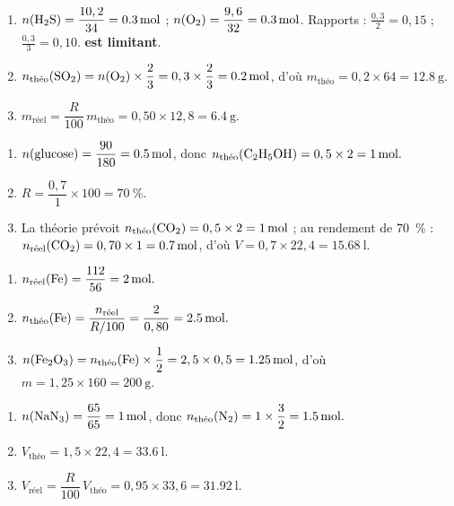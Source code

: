\documentclass[11pt,a4paper]{article}
\begin{document}
\begin{corrige}
\begin{enumerate}[label=\alph*)]
  \item $n(\ce{H2S})=\dfrac{10,2}{34}=\qty{0.3}{\mole}$ ; $n(\ce{O2})=\dfrac{9,6}{32}=\qty{0.3}{\mole}$.
        Rapports :  $\frac{0,3}{2}=0,15$ ;  $\frac{0,3}{3}=0,10$.
        \textbf{ est limitant}.
  \item $n_{\text{théo}}(\ce{SO2})=n(\ce{O2})\times\dfrac{2}{3}=0,3\times\dfrac{2}{3}=\qty{0.2}{\mole}$,
        d'où $m_{\text{théo}}=0,2\times64=\qty{12.8}{\gram}.$
  \item $m_{\text{réel}}=\dfrac{R}{100}\,m_{\text{théo}}=0,50\times12,8=\qty{6.4}{\gram}.$
\end{enumerate}
\end{corrige}

\begin{corrige}
\begin{enumerate}[label=\alph*)]
  \item $n(\ce{glucose})=\dfrac{90}{180}=\qty{0.5}{\mole}$, donc
        $n_{\text{théo}}(\ce{C2H5OH})=0,5\times2=\qty{1}{\mole}.$
  \item $R=\dfrac{0,7}{1}\times100=\qty{70}{\percent}.$
  \item La théorie prévoit $n_{\text{théo}}(\ce{CO2})=0,5\times2=\qty{1}{\mole}$ ; au rendement de
        \qty{70}{\percent} : $n_{\text{réel}}(\ce{CO2})=0,70\times1=\qty{0.7}{\mole}$, d'où
        $V=0,7\times22,4=\qty{15.68}{\litre}.$
\end{enumerate}
\end{corrige}

\begin{corrige}
\begin{enumerate}[label=\alph*)]
  \item $n_{\text{réel}}(\ce{Fe})=\dfrac{112}{56}=\qty{2}{\mole}.$
  \item $n_{\text{théo}}(\ce{Fe})=\dfrac{n_{\text{réel}}}{R/100}=\dfrac{2}{0,80}=\qty{2.5}{\mole}.$
  \item $n(\ce{Fe2O3})=n_{\text{théo}}(\ce{Fe})\times\dfrac{1}{2}=2,5\times0,5=\qty{1.25}{\mole}$,
        d'où $m=1,25\times160=\qty{200}{\gram}.$
\end{enumerate}
\end{corrige}

\begin{corrige}
\begin{enumerate}[label=\alph*)]
  \item $n(\ce{NaN3})=\dfrac{65}{65}=\qty{1}{\mole}$, donc
        $n_{\text{théo}}(\ce{N2})=1\times\dfrac{3}{2}=\qty{1.5}{\mole}.$
  \item $V_{\text{théo}}=1,5\times22,4=\qty{33.6}{\litre}.$
  \item $V_{\text{réel}}=\dfrac{R}{100}\,V_{\text{théo}}=0,95\times33,6=\qty{31.92}{\litre}.$
\end{enumerate}
\end{corrige}
\end{document}
